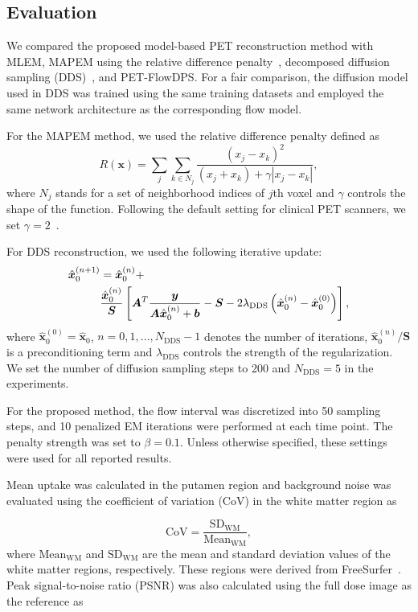 \documentclass[journal]{IEEEtran}
\begin{document}
\subsection{Evaluation}
We compared the proposed model-based PET reconstruction method with MLEM, MAPEM using the relative difference penalty~\cite{Nuyts2002}, decomposed diffusion sampling (DDS)~\cite{singh_2024}, and PET-FlowDPS. For a fair comparison, the diffusion model used in DDS was trained using the same training datasets and employed the same network architecture as the corresponding flow model.

For the MAPEM method, we used the relative difference penalty defined as
\begin{equation}
\label{eq:rdp}
R(\bm{x}) = \sum_{j}\sum_{k\in{N_j}}\frac{(x_j-x_k)^2}{(x_j+x_k)+\gamma\left|x_j-x_k\right|},
\end{equation}
where $N_j$ stands for a set of neighborhood indices of $j$th voxel and $\gamma$ controls the shape of the function. Following the default setting for clinical PET scanners, we set $\gamma=2$~\cite{Miwa2023}.

For DDS reconstruction, we used the following iterative update:
\begin{align}
\label{eq:dds}
\hat{\bm{x}}_0^{(n+1)}&=\hat{\bm{x}}_0^{(n)}\notag 
+\\
&\frac{\hat{\bm{x}}_0^{(n)}}{\bm{S}}\left[\bm{A}^T \frac{\bm{y}}{\bm{A}\hat{\bm{x}}_0^{(n)}+\bm{b}}-\bm{S}-2\lambda_\text{DDS}\left(\hat{\bm{x}}_0^{(n)}-\hat{\bm{x}}_0^{(0)}\right)\right],
\end{align}
where $\hat{\bm{x}}_0^{(0)}=\hat{\bm{x}}_0$, $n=0,1,\ldots,N_\text{DDS}-1$ denotes the number of iterations, $\hat{\bm{x}}_0^{(n)} / \bm{S}$ is a preconditioning term and $\lambda_\text{DDS}$ controls the strength of the regularization. We set the number of diffusion sampling steps to 200 and $N_\text{DDS}=5$ in the experiments.

For the proposed method, the flow interval was discretized into 50 sampling steps, and 10 penalized EM iterations were performed at each time point. The penalty strength was set to $\beta=0.1$. Unless otherwise specified, these settings were used for all reported results.

Mean uptake was calculated in the putamen region and background noise was evaluated using the coefficient of variation (CoV) in the white matter region as

\begin{equation}
\text{CoV} = \frac{\text{SD}_{\text{WM}}}{\text{Mean}_{\text{WM}}},
\label{eq:CoV}
\end{equation}
where $\text{Mean}_{\text{WM}}$ and $\text{SD}_{\text{WM}}$ are the mean and standard deviation values of the white matter regions, respectively. These regions were derived from FreeSurfer~\cite{FISCHL2012774}. Peak signal-to-noise ratio (PSNR) was also calculated using the full dose image as the reference as
\end{document}
